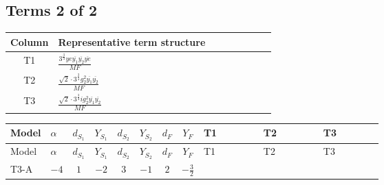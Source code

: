 \documentclass[8pt]{article}
\begin{document}
\begin{landscape}
\subsection*{Terms 2 of 2}
\begin{center}
\begin{tabular}{@{}c >{\raggedright\arraybackslash}p{0.82\linewidth}@{}}
\toprule
Column & Representative term structure \\
\midrule
T1 & \(\displaystyle \frac{3^{\frac{3}{4}} ye \overline{y_{1}} \overline{y_{2}} \overline{ye}}{MF}\) \\
\midrule
T2 & \(\displaystyle \frac{\sqrt{2} \cdot 3^{\frac{3}{4}} g_{2}^{2} \overline{y_{1}} \overline{y_{2}}}{MF}\) \\
\midrule
T3 & \(\displaystyle \frac{\sqrt{2} \cdot 3^{\frac{3}{4}} i g_{2}^{2} \overline{y_{1}} \overline{y_{2}}}{MF}\) \\
\midrule
\bottomrule
\end{tabular}
\end{center}
\smallskip
\tiny
\begin{longtable}{@{}llcccccc >{\raggedright\arraybackslash}p{0.21\linewidth} >{\raggedright\arraybackslash}p{0.21\linewidth} >{\raggedright\arraybackslash}p{0.21\linewidth}@{}}
\toprule
Model & $\alpha$ & $d_{S_1}$ & $Y_{S_1}$ & $d_{S_2}$ & $Y_{S_2}$ & $d_F$ & $Y_F$ & T1 & T2 & T3 \\
\midrule
\endfirsthead
\toprule
Model & $\alpha$ & $d_{S_1}$ & $Y_{S_1}$ & $d_{S_2}$ & $Y_{S_2}$ & $d_F$ & $Y_F$ & T1 & T2 & T3 \\
\midrule
\endhead
T3-A & $-4$ & $1$ & $-2$ & $3$ & $-1$ & $2$ & $-\frac{3}{2}$ & \scriptsize\adjustbox{max width=\linewidth}{$\begin{gathered} - \frac{3^{\frac{3}{4}} ye \overline{y_{1}} \overline{y_{2}} \overline{ye}}{12 MF}\end{gathered}$} & \scriptsize\adjustbox{max width=\linewidth}{$\begin{gathered} \frac{\sqrt{2} \cdot 3^{\frac{3}{4}} g_{2}^{2} \overline{y_{1}} \overline{y_{2}}}{6 MF}\end{gathered}$} & \scriptsize\adjustbox{max width=\linewidth}{$\begin{gathered} - \frac{\sqrt{2} \cdot 3^{\frac{3}{4}} i g_{2}^{2} \overline{y_{1}} \overline{y_{2}}}{6 MF}\end{gathered}$} \\
\midrule
\bottomrule
\end{longtable}
\clearpage

\end{landscape}
\end{document}
